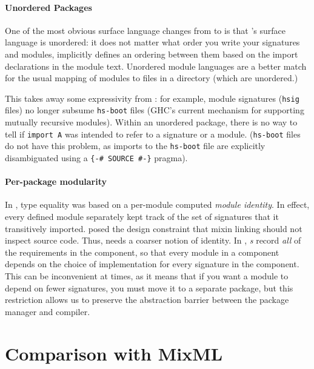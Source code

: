 \paragraph{Unordered Packages}

One of the most obvious surface language changes from \OldBackpack{}
to \Backpack{} is that \Backpack{}'s surface language is unordered: it
does not matter what order you write your signatures and modules, \Backpack{}
implicitly defines an ordering between them based on the import declarations
in the module text.  Unordered module languages are a better match for
the usual mapping of modules to files in a directory (which are unordered.)

This takes away some expressivity from \Backpack{}: for example, module
signatures (\verb|hsig| files) no longer subsume \verb|hs-boot| files
(GHC's current mechanism for supporting mutually recursive modules).
Within an unordered package, there is no way to tell if \verb|import A|
was intended to refer to a signature or a module.  (\verb|hs-boot| files
do not have this problem, as imports to the \verb|hs-boot| file are
explicitly disambiguated using a \verb|{-# SOURCE #-}| pragma).


\paragraph{Per-package modularity}

In \OldBackpack{}, type equality was based on a per-module computed
\emph{module identity}.  In effect, every defined module separately kept
track of the set of signatures that it transitively imported.
\Backpack{} posed the design constraint that mixin linking should not
inspect source code. Thus, \Backpack{} needs a coarser notion of
identity. In \Backpack{}, \emph{\uid{}s} record \emph{all} of the
requirements in the component, so that every module in a component
depends on the choice of implementation for every signature in the
component.  This can be inconvenient at times, as it means that if you
want a module to depend on fewer signatures, you must move it to a
separate package, but this restriction allows us to preserve the
abstraction barrier between the package manager and compiler.

\section{Comparison with MixML}

